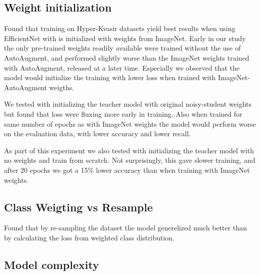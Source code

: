 \documentclass[thesis.tex]{subfiles}
\begin{document}
\subsection{Weight initialization}
Found that training on Hyper-Kvasir datasets yield best results when using EfficientNet with is initialized with weights from ImageNet. Early in our study the only pre-trained weights readily available were trained without the use of AutoAugment, and performed slightly worse than the ImageNet weights trained with AutoAugment, released at a later time. Especially we observed that the model would initialize the training with lower loss when trained with ImageNet-AutoAugment weigths.


We tested with initializing the teacher model with original noisy-student weights but found that loss were fluxing more early in training. Also when trained for same number of epochs as with ImageNet weights the model would perform worse on the evaluation data, with lower accuracy and lower recall.


As part of this experiment we also tested with initializing the teacher model with no weights and train from scratch. Not surprisingly, this gave slower training, and after 20 epochs we got a 15\% lower accuracy than when training with ImageNet weights.



\subsection{Class Weigting vs Resample}
Found that by re-sampling the dataset the model generelized much better than by calculating the loss from weighted class distribution.




\subsection{Model complexity}
\end{document}
